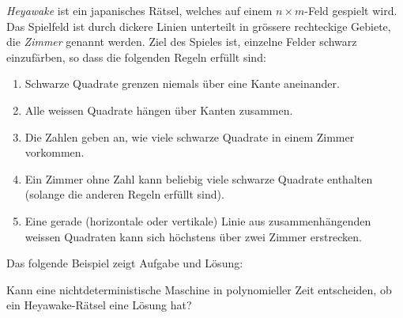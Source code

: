 {\em Heyawake} ist ein japanisches Rätsel, welches auf einem $n\times m$-Feld
gespielt wird. Das Spielfeld ist durch dickere Linien unterteilt in grössere rechteckige Gebiete, die {\it Zimmer} genannt werden. 
Ziel des Spieles ist, einzelne Felder schwarz einzufärben, so dass die
folgenden Regeln erfüllt sind:
\begin{enumerate}
\item
Schwarze Quadrate grenzen niemals über eine Kante aneinander.
\item
Alle weissen Quadrate hängen über Kanten zusammen.
\item
Die Zahlen geben an, wie viele schwarze Quadrate in einem Zimmer vorkommen.
\item
Ein Zimmer ohne Zahl kann beliebig viele schwarze Quadrate enthalten
(solange die anderen Regeln erfüllt sind).
\item
Eine gerade (horizontale oder vertikale) Linie aus zusammenhängenden
weissen Quadraten kann sich höchstens über zwei Zimmer erstrecken.
\end{enumerate}
Das folgende Beispiel zeigt Aufgabe und Lösung:
\begin{center}
\qquad
{}
\end{center}

Kann eine nichtdeterministische Maschine in polynomieller Zeit entscheiden,
ob ein Heyawake-Rätsel eine Lösung hat?


